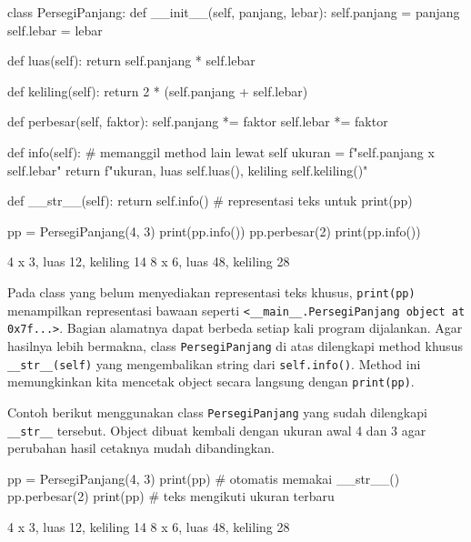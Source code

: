 \begin{kode}
class PersegiPanjang:
    def __init__(self, panjang, lebar):
        self.panjang = panjang
        self.lebar = lebar

    def luas(self):
        return self.panjang * self.lebar

    def keliling(self):
        return 2 * (self.panjang + self.lebar)

    def perbesar(self, faktor):
        self.panjang *= faktor
        self.lebar *= faktor

    def info(self):
        # memanggil method lain lewat self
        ukuran = f"{self.panjang} x {self.lebar}"
        return f"{ukuran}, luas {self.luas()}, keliling {self.keliling()}"

    def __str__(self):
        return self.info()        # representasi teks untuk print(pp)

pp = PersegiPanjang(4, 3)
print(pp.info())
pp.perbesar(2)
print(pp.info())
\end{kode}

\begin{keluaran}
4 x 3, luas 12, keliling 14
8 x 6, luas 48, keliling 28
\end{keluaran}

\begin{tips}
Pada class yang belum menyediakan representasi teks khusus, \texttt{print(pp)} menampilkan representasi bawaan seperti \texttt{<\_\_main\_\_.PersegiPanjang object at 0x7f...>}. Bagian alamatnya dapat berbeda setiap kali program dijalankan. Agar hasilnya lebih bermakna, class \texttt{PersegiPanjang} di atas dilengkapi method khusus \texttt{\_\_str\_\_(self)} yang mengembalikan string dari \texttt{self.info()}. Method ini memungkinkan kita mencetak object secara langsung dengan \texttt{print(pp)}.
\end{tips}

Contoh berikut menggunakan class \texttt{PersegiPanjang} yang sudah dilengkapi \texttt{\_\_str\_\_} tersebut. Object dibuat kembali dengan ukuran awal 4 dan 3 agar perubahan hasil cetaknya mudah dibandingkan.

\begin{kode}
pp = PersegiPanjang(4, 3)
print(pp)                 # otomatis memakai __str__()
pp.perbesar(2)
print(pp)                 # teks mengikuti ukuran terbaru
\end{kode}

\begin{keluaran}
4 x 3, luas 12, keliling 14
8 x 6, luas 48, keliling 28
\end{keluaran}


